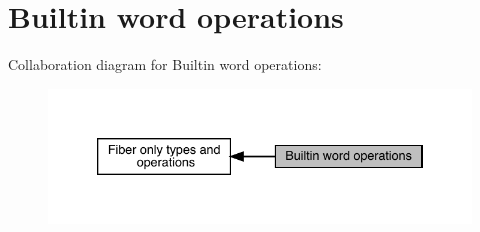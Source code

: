 \hypertarget{group__simpleword}{}\section{Builtin word operations}
\label{group__simpleword}
Collaboration diagram for Builtin word operations\+:\nopagebreak
\begin{figure}[H]
\begin{center}
\leavevmode
\includegraphics[width=339pt]{dd/d99/group__simpleword}
\end{center}
\end{figure}
